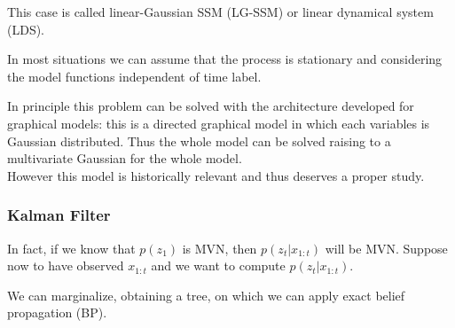 \documentclass{article}
\begin{document}
This case is called linear-Gaussian SSM (LG-SSM) or linear dynamical system (LDS).

In most situations we can assume that the process is stationary and considering the model functions independent of time label.

In principle this problem can be solved with the architecture developed for graphical models: this is a directed graphical model in which each variables is Gaussian distributed. Thus the whole model can be solved raising to a multivariate Gaussian for the whole model.\\
However this model is historically relevant and thus deserves a proper study.

\subsubsection{Kalman Filter}
In fact, if we know that $p(z_1)$ is MVN, then $p(z_t|x_{1:t})$ will be MVN.
Suppose now to have observed $x_{1:t}$ and we want to compute $p(z_t|x_{1:t})$.

\begin{center}
\end{center}

We can marginalize, obtaining a tree, on which we can apply exact belief propagation (BP).

\begin{center}
\end{center}
\end{document}
